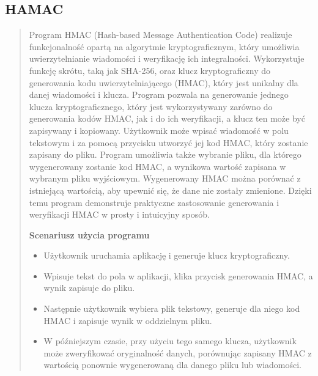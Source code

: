\documentclass[12pt,a4paper]{article}
\begin{document}
\subsection{HAMAC}
\begin{quotation} \noindent Program HMAC (Hash-based Message Authentication Code) realizuje funkcjonalność opartą na algorytmie kryptograficznym, który umożliwia uwierzytelnianie wiadomości i weryfikację ich integralności. Wykorzystuje funkcję skrótu, taką jak SHA-256, oraz klucz kryptograficzny do generowania kodu uwierzytelniającego (HMAC), który jest unikalny dla danej wiadomości i klucza. Program pozwala na generowanie jednego klucza kryptograficznego, który jest wykorzystywany zarówno do generowania kodów HMAC, jak i do ich weryfikacji, a klucz ten może być zapisywany i kopiowany. Użytkownik może wpisać wiadomość w polu tekstowym i za pomocą przycisku utworzyć jej kod HMAC, który zostanie zapisany do pliku. Program umożliwia także wybranie pliku, dla którego wygenerowany zostanie kod HMAC, a wynikowa wartość zapisana w wybranym pliku wyjściowym. Wygenerowany HMAC można porównać z istniejącą wartością, aby upewnić się, że dane nie zostały zmienione. Dzięki temu program demonstruje praktyczne zastosowanie generowania i weryfikacji HMAC w prosty i intuicyjny sposób.\newline

\noindent\textbf{Scenariusz użycia programu}
\begin{itemize}
\item Użytkownik uruchamia aplikację i generuje klucz kryptograficzny.
\item Wpisuje tekst do pola w aplikacji, klika przycisk generowania HMAC, a wynik zapisuje do pliku.
\item Następnie użytkownik wybiera plik tekstowy, generuje dla niego kod HMAC i zapisuje wynik w oddzielnym pliku.
\item W późniejszym czasie, przy użyciu tego samego klucza, użytkownik może zweryfikować oryginalność danych, porównując zapisany HMAC z wartością ponownie wygenerowaną dla danego pliku lub wiadomości.
\end{itemize}
\end{quotation}
\end{document}
